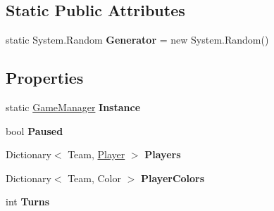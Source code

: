 \subsection*{Static Public Attributes}
\begin{DoxyCompactItemize}
\item 
\hypertarget{class_game_manager_aca9cdc903197db645761481bc438d5bc}{}static System.\+Random {\bfseries Generator} = new System.\+Random()\label{class_game_manager_aca9cdc903197db645761481bc438d5bc}

\end{DoxyCompactItemize}
\subsection*{Properties}
\begin{DoxyCompactItemize}
\item 
\hypertarget{class_game_manager_ad3e717f4fb0f378b969f4457de81f23e}{}static \hyperlink{class_game_manager}{Game\+Manager} {\bfseries Instance}\label{class_game_manager_ad3e717f4fb0f378b969f4457de81f23e}

\item 
\hypertarget{class_game_manager_a2148964c08045eeffa55ae1f9fdf1a00}{}bool {\bfseries Paused}\label{class_game_manager_a2148964c08045eeffa55ae1f9fdf1a00}

\item 
\hypertarget{class_game_manager_aac60fa24400ba0854925daadfef895f0}{}Dictionary$<$ Team, \hyperlink{class_player}{Player} $>$ {\bfseries Players}\label{class_game_manager_aac60fa24400ba0854925daadfef895f0}

\item 
\hypertarget{class_game_manager_a8f8aa933bf456615255a56297815afde}{}Dictionary$<$ Team, Color $>$ {\bfseries Player\+Colors}\label{class_game_manager_a8f8aa933bf456615255a56297815afde}

\item 
\hypertarget{class_game_manager_ac55a267b91a46343f3b7d60518372784}{}int {\bfseries Turns}\label{class_game_manager_ac55a267b91a46343f3b7d60518372784}

\end{DoxyCompactItemize}


